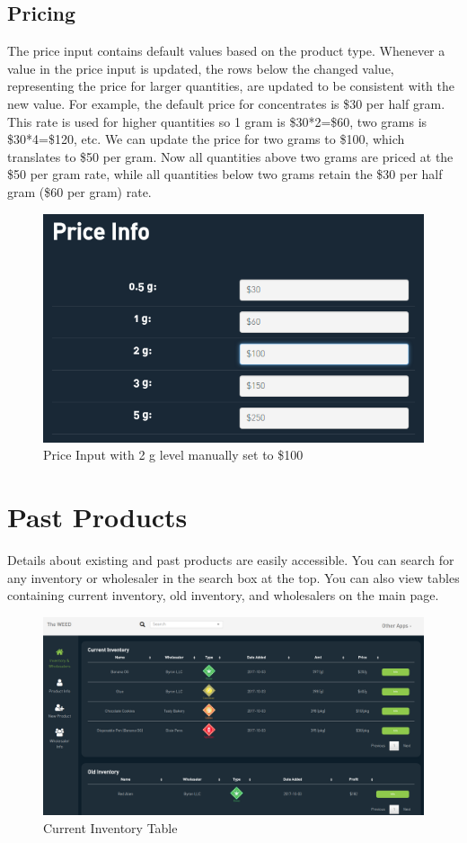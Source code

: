 \documentclass[]{book}
\theoremstyle{definition}
\theoremstyle{definition}
\theoremstyle{definition}
\theoremstyle{remark}
\begin{document}
\subsection{Pricing}\label{pricing}

The price input contains default values based on the product type.
Whenever a value in the price input is updated, the rows below the
changed value, representing the price for larger quantities, are updated
to be consistent with the new value. For example, the default price for
concentrates is \$30 per half gram. This rate is used for higher
quantities so 1 gram is \$30*2=\$60, two grams is \$30*4=\$120, etc. We
can update the price for two grams to \$100, which translates to \$50
per gram. Now all quantities above two grams are priced at the \$50 per
gram rate, while all quantities below two grams retain the \$30 per half
gram (\$60 per gram) rate.

\begin{figure}
\centering
\includegraphics{images/I3.png}
\caption{Price Input with 2 g level manually set to \$100}
\end{figure}

\section{Past Products}\label{past-products}

Details about existing and past products are easily accessible. You can
search for any inventory or wholesaler in the search box at the top. You
can also view tables containing current inventory, old inventory, and
wholesalers on the main page.

\begin{figure}
\centering
\includegraphics{images/inventory.png}
\caption{Current Inventory Table}
\end{figure}
\end{document}
